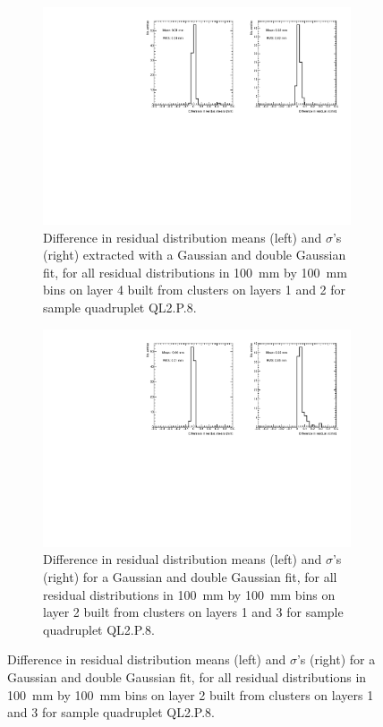 \newpage
\thispagestyle{empty}
\begin{figure}
\centering
 \begin{subfigure}{\textwidth}
    \includegraphics[width = \linewidth]{figures/figure_compare_residual_fits_QL2P08_3100V_2021-06-18_no_dnl_minus_QL2P08_3100V_2021-07-19_doub_gaus_log_scale_layer4_fixedlayers12.pdf} 
    \caption{Difference in residual distribution means (left) and $\sigma$'s (right) extracted with a Gaussian and double Gaussian fit, for all residual distributions in \SI{100}{\milli\meter} by \SI{100}{\milli\meter} bins on layer 4 built from clusters on layers 1 and 2 for sample quadruplet QL2.P.8.}
    \label{fig:double_Gaussian_compare_fits_L4_F12}
  \end{subfigure}
\vspace*{\floatsep}
 
 \begin{subfigure}{\textwidth}
    \includegraphics[width = \linewidth]{figures/figure_compare_residual_fits_QL2P08_3100V_2021-06-18_no_dnl_minus_QL2P08_3100V_2021-07-19_doub_gaus_log_scale_layer2_fixedlayers13.pdf} 
    \caption{Difference in residual distribution means (left) and $\sigma$'s (right) for a Gaussian and double Gaussian fit, for all residual distributions in \SI{100}{\milli\meter} by \SI{100}{\milli\meter} bins on layer 2 built from clusters on layers 1 and 3 for sample quadruplet QL2.P.8.}
    \label{fig:double_Gaussian_compare_fits_L2_F13}
  \end{subfigure}
  

\end{figure}
